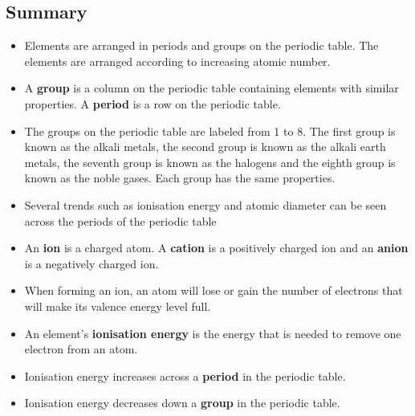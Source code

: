             \subsection{ Summary}
            \nopagebreak
            \label{m38757*uid0123}\begin{itemize}[noitemsep]
            \label{m38757*id79342}\item Elements are arranged in periods and groups on the periodic table. The elements are arranged according to increasing atomic number. 
\label{m38757*id97342}\item A \textbf{group} is a column on the periodic table containing elements with similar properties. A \textbf{period} is a row on the periodic table.
\item The groups on the periodic table are labeled from 1 to 8. The first group is known as the alkali metals, the second group is known as the alkali earth metals, the seventh group is known as the halogens and the eighth group is known as the noble gases. Each group has the same properties.\item Several trends such as ionisation energy and atomic diameter can be seen across the periods of the periodic table\label{m38757*uid184}\item An \textbf{ion} is a charged atom. A \textbf{cation} is a positively charged ion and an \textbf{anion} is a negatively charged ion.
\label{m38757*uid185}\item When forming an ion, an atom will lose or gain the number of electrons that will make its valence energy level full.
\label{m38757*uid186}\item An element's \textbf{ionisation energy} is the energy that is needed to remove one electron from an atom.
\label{m38757*uid187}\item Ionisation energy increases across a \textbf{period} in the periodic table.
\label{m38757*uid188}\item Ionisation energy decreases down a \textbf{group} in the periodic table.
\end{itemize}
        \label{m38757*eip-219}
            



